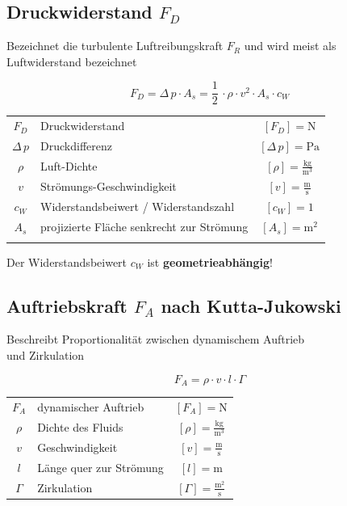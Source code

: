 \subsection{Druckwiderstand $F_D$}
Bezeichnet die turbulente Luftreibungskraft $F_R$ und wird meist als Luftwiderstand bezeichnet 

$$ \boxed{ F_D = \Delta \, p \cdot A_s = \frac{1}{2} \, \cdot \rho \cdot v^2 \cdot A_s \cdot c_W } $$


\begin{tabular}{c l c}
		$F_D$ & Druckwiderstand & $[F_D] = \mathrm{N}$ \\
		$\Delta \, p$ & Druckdifferenz & $[\Delta \, p] = \mathrm{Pa}$  \\
		\rule{0pt}{8pt}$\rho$ & Luft-Dichte & $[\rho] = \mathrm{\frac{kg}{m^3}}$ \\
		\rule{0pt}{8pt}$v$ & Strömungs-Geschwindigkeit & $[v] = \mathrm{\frac{m}{s}}$ \\
		$c_W$ & Widerstandsbeiwert / Widerstandszahl & $[c_W] = 1$\\
		$A_s$ & projizierte Fläche senkrecht zur Strömung & $[A_s] = \mathrm{m^2}$ \\
		\\
\end{tabular}

Der Widerstandsbeiwert $c_W$ ist \textbf{geometrieabhängig}!






\subsection{Auftriebskraft $F_A$ nach Kutta-Jukowski}
Beschreibt Proportionalität zwischen dynamischem Auftrieb \\
und Zirkulation 

$$ \boxed{ F_A = \rho \cdot v \cdot l \cdot \Gamma } $$

\begin{tabular}{c l c}
		$F_A$ & dynamischer Auftrieb & $[F_A] = \mathrm{N}$ \\
		\rule{0pt}{8pt}$\rho$ & Dichte des Fluids & $[\rho] = \mathrm{\frac{kg}{m^3}}$ \\
		\rule{0pt}{8pt}$v$ & Geschwindigkeit & $[v] = \mathrm{\frac{m}{s}}$ \\
		$l$ & Länge quer zur Strömung & $[l] = \mathrm{m}$ \\
		\rule{0pt}{8pt}$\Gamma$ & Zirkulation & $[\Gamma] = \mathrm{\frac{m^2}{s}}$ \\
\end{tabular}







